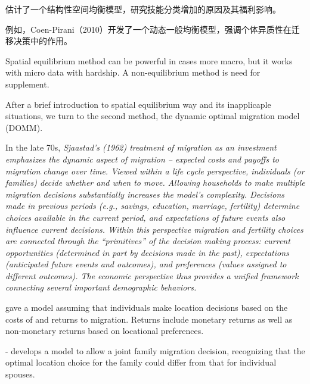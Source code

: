 \documentclass[a4paper,12pt,oneside]{book} %
\begin{document}
\cite{diamondDeterminantsWelfareImplications2016}估计了一个结构性空间均衡模型，研究技能分类增加的原因及其福利影响。

例如，Coen-Pirani（2010）开发了一个动态一般均衡模型，强调个体异质性在迁移决策中的作用。

\cite{LiuHuaRenLiZiBenKongJianPeiZhiDeSheHuiFuLiXiaoYingYanJiuJiYuLiangHuaKongJianYiBanJunHengMoXingDeFenXi2024}

\cite{WangLiLiLaoDongLiLiuDongDuiChengShiGongZiYuFuLiDeYingXiangJiYuKongJianJunHengMoXingDeFenXi2024}

Spatial equilibrium method can be powerful in cases more macro, but it works with micro data with hardship. A non-equilibrium method is need for supplement.



After a brief introduction to spatial equilibrium way and its inapplicaple situations, we turn to the second method, the dynamic optimal migration model (DOMM).

In the late 70s, 
\textit{Sjaastad’s (1962) treatment of migration as an investment emphasizes the dynamic aspect of migration – expected costs and payoffs to migration change over time. Viewed  within a life cycle perspective, individuals (or families) decide whether and when to  move. Allowing households to make multiple migration decisions substantially increases the model’s complexity. Decisions made in previous periods (e.g., savings, education,  marriage, fertility) determine choices available in the current period, and expectations  of future events also influence current decisions. Within this perspective migration and  fertility choices are connected through the “primitives” of the decision making process:  current opportunities (determined in part by decisions made in the past), expectations (anticipated future events and outcomes), and preferences (values assigned to different outcomes). The economic perspective thus provides a unified framework connecting several important demographic behaviors.}


\cite{sjaastadCostsReturnsHuman1962} gave a model assuming that individuals make location decisions based on the costs of and returns to migration. Returns include monetary returns as well as non-monetary returns based on locational preferences.


- \cite{mincerFamilyMigrationDecisions1978} develops a model to allow a joint family migration decision, recognizing that the optimal location choice for the family could differ from that for individual spouses.
\end{document}
